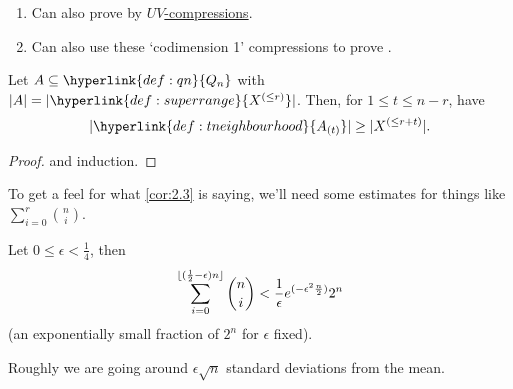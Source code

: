 \documentclass{article}
\DeclarePairedDelimiter\floor{\lfloor}{\rfloor}
\let\subset\subseteq
\begin{document}
\begin{remark}\leavevmode
  \begin{enumerate}[label=\arabic*.]
    \item Can also prove  by \hyperlink{def:uvcomp}{$UV$-compressions}.
    \item Can also use these `codimension 1' compressions to prove .
  \end{enumerate}
\end{remark}
\begin{ncor}\label{cor:2.3}
  Let $A \subset \hyperlink{def:qn}{Q_n}$ with $|A| = |\hyperlink{def:superrange}{X^{(\leq r)}}|$. Then, for $1 \leq t \leq n-r$, have
  \begin{equation*}
    |\hyperlink{def:tneighbourhood}{A_{(t)}}| \geq |X^{(\leq r + t)}|.
  \end{equation*}
\end{ncor}
\begin{proof}
   and induction.
\end{proof}
To get a feel for what \cref{cor:2.3} is saying, we'll need some estimates for things like $\sum_{i=0}^r \binom{n}{i}$.
\begin{nprop}\label{prop:2.4}
  Let $0 \leq \epsilon < \frac{1}{4}$, then
  \begin{equation*}
    \sum_{i=0}^{\floor{(\frac{1}{2} - \epsilon) n}} \binom{n}{i} < \frac{1}{\epsilon} e^{(-\epsilon^2 \frac{n}{2})} 2^n
  \end{equation*}
  (an exponentially small fraction of $2^n$ for $\epsilon$ fixed).
\end{nprop}
Roughly we are going around $\epsilon \sqrt{n}$ standard deviations from the mean.
\end{document}
